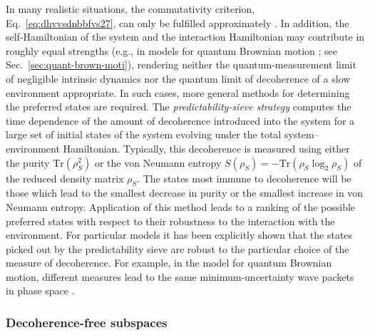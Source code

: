 \documentclass[aps,pra,reprint,amsmath,amssymb,showpacs,nofootinbib,floatfix,onecolumn,12pt]{revtex4-1}
\begin{document}
In many realistic situations, the commutativity criterion, Eq.~\eqref{eq:dhvvsdnbbfvs27}, can only be fulfilled approximately \cite{Zurek:1993:qq,Zurek:1993:pu}. In addition, the self-Hamiltonian of the system and the interaction Hamiltonian may contribute in roughly equal strengths (e.g., in models for quantum Brownian motion  \cite{Hu:1992:om,Paz:2001:aa}; see Sec.~\ref{sec:quant-brown-moti}), rendering neither the quantum-measurement limit of negligible intrinsic dynamics nor the quantum limit of decoherence of a slow environment appropriate. In such cases, more general methods for determining the preferred states are required. The \emph{predictability-sieve strategy} \cite{Zurek:1993:pu,Zurek:1998:re,Zurek:1993:qq} computes the time dependence of the amount of decoherence introduced into the system for a large set of initial states of the system evolving under the total system--environment Hamiltonian. Typically, this decoherence is measured using either the purity $\text{Tr} \left(\rho_S^2 \right)$ or the von Neumann entropy $S(\rho_S) = - \text{Tr}\left( \rho_S \log_2 \rho_S \right)$ of the reduced density matrix $\rho_S$. The states most immune to decoherence will be those which lead to the smallest decrease in purity or the smallest increase in von Neumann entropy. Application of this method leads to a ranking of the possible preferred states with respect to their robustness to the interaction with the environment. For particular models it has been explicitly shown that the
states picked out by the predictability sieve are robust to the particular choice of the measure of decoherence. For example, in the model for quantum Brownian motion, different measures lead to the same minimum-uncertainty wave packets in phase space \cite{Kubler:1973:ux,Zurek:1993:pu,Zurek:2002:ii,Diosi:2000:yn,Joos:2003:jh,Eisert:2003:ib}.


\subsubsection{\label{sec:dfs}Decoherence-free subspaces}
\end{document}
